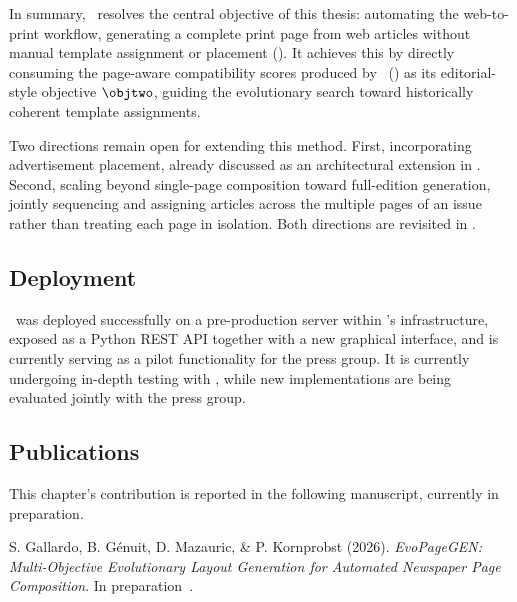 In summary, \methodNameGeneral\ resolves the central objective of this thesis: automating the \melody web-to-print workflow, generating a complete print page from web articles without manual template assignment or placement (). It achieves this by directly consuming the page-aware compatibility scores produced by \neuralmethod\ () as its editorial-style objective $\objtwo$, guiding the evolutionary search toward historically coherent template assignments. 

Two directions remain open for extending this method. 
First, incorporating advertisement placement, already discussed as an architectural extension in .
Second, scaling beyond single-page composition toward full-edition generation, jointly sequencing and assigning articles across the multiple pages of an issue rather than treating each page in isolation. Both directions are revisited in .

\subsection*{Deployment}

\methodNameGeneral\ was deployed successfully on a pre-production server within \melody's infrastructure, exposed as a Python REST API together with a new \melody graphical interface, and is currently serving as a pilot functionality for the \laprovence press group. It is currently undergoing in-depth testing with \laprovence, while new implementations are being evaluated jointly with the \publihebdos press group.

\subsection*{Publications}

This chapter's contribution is reported in the following manuscript, currently in preparation.

\begin{callout}
S. Gallardo, B. G\'enuit, D. Mazauric, \& P. Kornprobst (2026). \emph{EvoPageGEN: Multi-Objective Evolutionary Layout Generation for Automated Newspaper Page Composition}. In preparation~.
\end{callout}
